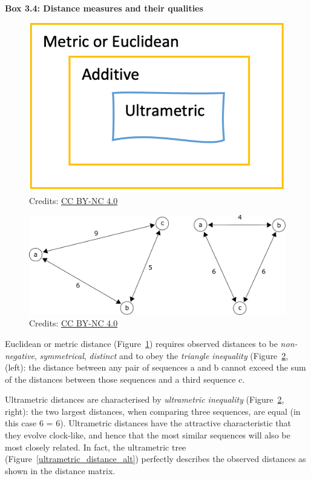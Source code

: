 \begin{framed}
\textbf{Box 3.4: Distance measures and their qualities}\\
\begin{figure}[!htbp]
\centering
\includegraphics[width=0.375\linewidth]{files/distances-0a3e8103842dfb096f52aba307814e2a.png}
\caption[]{Credits: \href{https://creativecommons.org/licenses/by-nc/4.0/}{CC BY-NC 4.0} \newline
\cite{own_3_2024}}
\label{distances}
\end{figure}

\begin{figure}[!htbp]
\centering
\includegraphics[width=0.375\linewidth]{files/inequality_alt-084cf637e6e35dcf5c4f16a814a1c66d.pdf}
\caption[]{Credits: \href{https://creativecommons.org/licenses/by-nc/4.0/}{CC BY-NC 4.0} \newline
\cite{own_3_2024}}
\label{inequality_alt}
\end{figure}

Euclidean or metric distance (Figure~\ref{distances}) requires observed distances to be \textit{non-negative}, \textit{symmetrical}, \textit{distinct} and to obey the \textit{triangle inequality} (Figure~\ref{inequality_alt}, (left): the distance between any pair of sequences a and b cannot exceed the sum of the distances between those sequences and a third sequence c.

Ultrametric distances are characterised by \textit{ultrametric inequality} (Figure~\ref{inequality_alt}, right): the two largest distances, when comparing three sequences, are equal (in this case 6 = 6).
Ultrametric distances have the attractive characteristic that they evolve clock-like, and hence that the most similar sequences will also be most closely related.
In fact, the ultrametric tree (Figure~\ref{ultrametric_distance_alt}) perfectly describes the observed distances as shown in the distance matrix.
\end{framed}


